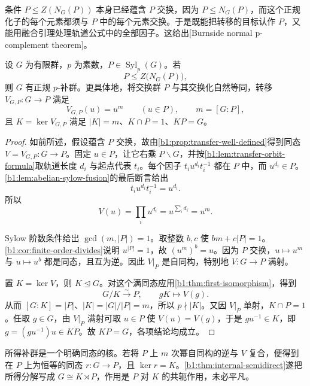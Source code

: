 条件 \(P\leq Z(N_G(P))\) 本身已经蕴含 \(P\) 交换，因为 \(P\leq N_G(P)\)，而这个正规化子的每个元素都须与 \(P\) 中的每个元素交换。于是既能把转移的目标认作 \(P\)，又能用融合引理处理轨道公式中的全部因子。这给出[Burnside normal p-complement theorem]。

\begin{theorem}\label{b1:thm:burnside-normal-p-complement}
	设 \(G\) 为有限群，\(p\) 为素数，\(P\in\operatorname{Syl}_p(G)\)。若
	\[
		P\leq Z\bigl(N_G(P)\bigr),
	\]
	则 \(G\) 有正规 \(p\)-补群。更具体地，将交换群 \(P\) 与其交换化自然等同，转移 \(V_{G,P}:G\rightarrow P\) 满足
	\begin{equation}\label{b1:eq:burnside-transfer-restriction}
		V_{G,P}(u)=u^m\qquad(u\in P),\qquad m=[G:P],
	\end{equation}
	且 \(K=\ker V_{G,P}\) 满足 \(|K|=m\)、\(K\cap P=1\)、\(KP=G\)。
\end{theorem}

\begin{proof}
	如前所述，假设蕴含 \(P\) 交换，故由\cref{b1:prop:transfer-well-defined}得到同态 \(V=V_{G,P}:G\rightarrow P\)。固定 \(u\in P\)，让它右乘 \(P\backslash G\)，并按\cref{b1:lem:transfer-orbit-formula}取轨道长度 \(d_i\) 与起点代表 \(t_i\)。每个因子 \(t_iu^{d_i}t_i^{-1}\) 都在 \(P\) 中，而 \(u^{d_i}\in P\)。\cref{b1:lem:abelian-sylow-fusion}的最后断言给出
	\[
		t_iu^{d_i}t_i^{-1}=u^{d_i}.
	\]
	所以
	\[
		V(u)=\prod_i u^{d_i}=u^{\sum_i d_i}=u^m.
	\]

	Sylow 阶数条件给出 \(\gcd(m,|P|)=1\)。取整数 \(b,c\) 使 \(bm+c|P|=1\)。\cref{b1:cor:finite-order-divides}说明 \(u^{|P|}=1\)，故 \((u^m)^b=u\)。因为 \(P\) 交换，\(u\mapsto u^m\) 与 \(u\mapsto u^b\) 都是同态，且互为逆。因此 \(V|_P\) 是自同构，特别地 \(V:G\rightarrow P\) 满射。

	置 \(K=\ker V\)，则 \(K\trianglelefteq G\)。对这个满同态应用\cref{b1:thm:first-isomorphism}，得到
	\[
		G/K\xrightarrow{\sim}P,\qquad gK\longmapsto V(g).
	\]
	从而 \([G:K]=|P|\)、\(|K|=|G|/|P|=m\)，所以 \(p\nmid|K|\)。又因 \(V|_P\) 单射，\(K\cap P=1\)。任取 \(g\in G\)，由 \(V|_P\) 满射可取 \(u\in P\) 使 \(V(u)=V(g)\)，于是 \(gu^{-1}\in K\)，即 \(g=(gu^{-1})u\in KP\)。故 \(KP=G\)，各项结论均成立。
\end{proof}

所得补群是一个明确同态的核。若将 \(P\) 上 \(m\) 次幂自同构的逆与 \(V\) 复合，便得到在 \(P\) 上为恒等的同态 \(r:G\rightarrow P\)，且 \(\ker r=K\)。\cref{b1:thm:internal-semidirect}遂把所得分解写成 \(G\cong K\rtimes P\)，作用是 \(P\) 对 \(K\) 的共轭作用，未必平凡。


